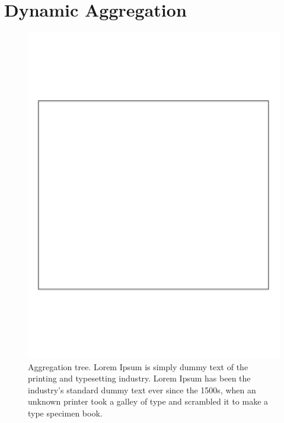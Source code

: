 \section{Dynamic Aggregation}
\label{sec:dynagg}

\begin{figure}[htb!]
\begin{center}
\includegraphics[scale=0.39]{figs/blankbox}
\caption{Aggregation tree. Lorem Ipsum is simply dummy text of the printing and typesetting industry. Lorem Ipsum has 
been the industry's standard dummy text ever since the 1500s, when an unknown printer took a galley of 
type and scrambled it to make a type specimen book.  }
\label{fig:aggtree}
\end{center}
\end{figure}

